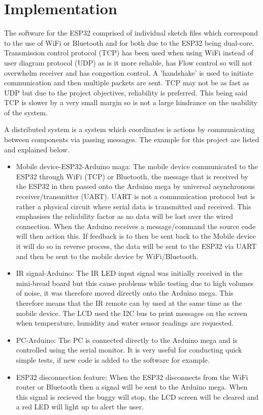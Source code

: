 \documentclass[8pt, a4paper]{article}
\begin{document}
\section{Implementation}

The software for the ESP32 comprised of individual sketch files which correspond to the use of WiFi or Bluetooth and for both due to the ESP32 being dual-core. Transmission control protocol (TCP) has been used when using WiFi instead of user diagram protocol (UDP) as is it more reliable, has Flow control so will not overwhelm receiver and has congestion control. A 'handshake' is used to initiate communication and then multiple packets are sent. TCP may not be as fast as UDP but due to the project objectives, reliability is preferred. This being said TCP is slower by a very small margin so is not a large hindrance on the usability of the system. 


A distributed system is a system which coordinates is actions by communicating between components via passing messages. The example for this project are listed and explained below.

\begin{itemize}
	\item Mobile device-ESP32-Arduino maga: The mobile device communicated to the ESP32 through WiFi (TCP) or Bluetooth, the message that is received by the ESP32 in then passed onto the Arduino mega by universal asynchronous receiver/transmitter (UART). UART is not a communication protocol but is rather a physical circuit where serial data is transmitted and received. This emphasises the reliability factor as no data will be lost over the wired connection. When the Arduino receives a message/command the source code will then action this. If feedback is to then be sent back to the Mobile device it will do so in reverse process, the data will be sent to the ESP32 via UART and then be sent to the mobile device by WiFi/Bluetooth. 
	\item IR signal-Arduino: The IR LED input signal was initially received in the mini-bread board but this cause problems while testing due to high volumes of noise, it was therefore moved directly onto the Arduino mega. This therefore means that the IR remote can by used at the same time as the mobile device. The LCD used the I2C bus to print messages on the screen when temperature, humidity and water sensor readings are requested. 
	\item  PC-Arduino: The PC is connected directly to the Arduino mega and is controlled using the serial monitor. It is very useful for conducting quick simple tests, if new code is added to the software for example. 
	\item ESP32 disconnection feature: When the ESP32 disconnects from the WiFi router or Bluetooth then a signal will be sent to the Arduino mega. When this signal is recieved the buggy will stop, the LCD screen will be cleared and a red LED will light up to alert the user. 
\end{itemize} 
\end{document}
